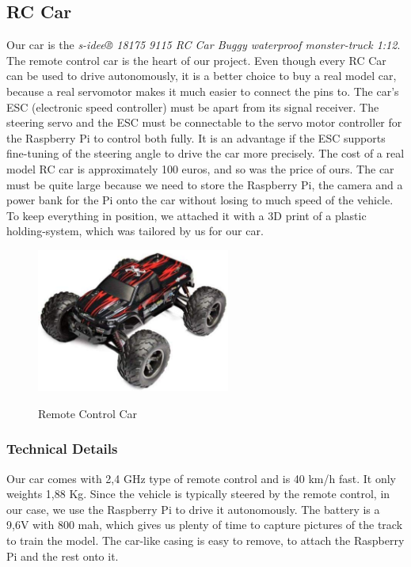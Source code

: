 \documentclass[journal]{IEEEtran}
\begin{document}
\subsection{RC Car}
Our car is the \textit{s-idee® 18175 9115 RC Car Buggy waterproof monster-truck 1:12}.
The remote control car is the heart of our project. Even though every RC Car can be used to drive autonomously, it is a better choice to buy a real model car, because a real servomotor makes it much easier to connect the pins to. The car’s ESC (electronic speed controller) must be apart from its signal receiver. The steering servo and the ESC must be connectable to the servo motor controller for the Raspberry Pi to control both fully. It is an advantage if the ESC supports fine-tuning of the steering angle to drive the car more precisely. 
The cost of a real model RC car is approximately 100 euros, and so was the price of ours. The car must be quite large because we need to store the Raspberry Pi, the camera and a power bank for the Pi onto the car without losing to much speed of the vehicle. To keep everything in position, we attached it with a 3D print of a plastic holding-system, which was tailored by us for our car. \\
\begin{figure}
  \begin{center}
  \includegraphics[width=2.5in]{photo/car.jpg}\\
  \caption{Remote Control Car}\label{car}
  \end{center}
\end{figure}
\subsubsection{Technical Details}
Our car comes with 2,4 GHz type of remote control and is 40 km/h fast. It only weights 1,88 Kg. Since the vehicle is typically steered by the remote control, in our case, we use the Raspberry Pi to drive it autonomously. The battery is a 9,6V with 800 mah, which gives us plenty of time to capture pictures of the track to train the model. The car-like casing is easy to remove, to attach the Raspberry Pi and the rest onto it.
\end{document}
